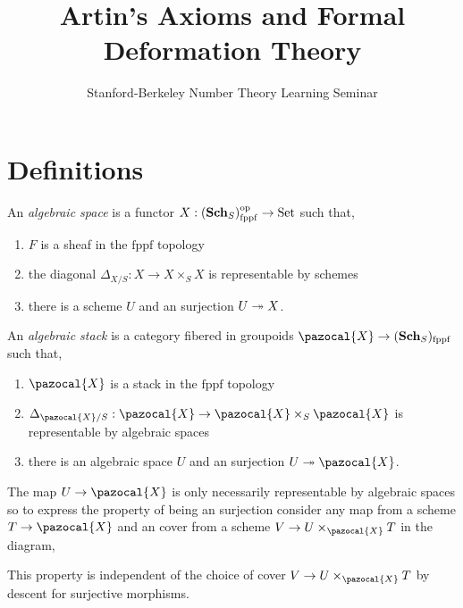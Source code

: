 \documentclass[12pt]{article}
\newcommand{\fppf}{\mathrm{fppf}}
\newcommand{\Set}{\mathrm{Set}}
\renewcommand{\X}{\pazocal{X}}
\begin{document}
\title{Artin's Axioms and Formal Deformation Theory}
\author{Stanford-Berkeley Number Theory Learning Seminar}
\maketitle

\section{Definitions}


\begin{defn}
An \textit{algebraic space} is a functor $X : (\Sch_S)_{\fppf}^{\op} \to \Set$ such that,
\begin{enumerate}
\item $F$ is a sheaf in the $\fppf$ topology
\item the diagonal $\Delta_{X/S} : X \to X \times_S X$ is representable by schemes
\item there is a scheme $U$ and an \etale surjection $U \twoheadrightarrow X$.
\end{enumerate}
\end{defn}

\begin{defn}
An \textit{algebraic stack} is a category fibered in groupoids $\X \to (\Sch_S)_{\fppf}$ such that,
\begin{enumerate}
\item $\X$ is a stack in the $\fppf$ topology
\item $\Delta_{\X / S} : \X \to \X \times_S \X$ is representable by algebraic spaces 
\item there is an algebraic space $U$ and an \etale surjection $U \onto \X$.
\end{enumerate}
\end{defn}

\begin{rmk}
The map $U \to \X$ is only necessarily representable by algebraic spaces so to express the property of being an \etale surjection consider any map from a scheme $T \to \X$ and an \etale cover from a scheme $V \to U \times_{\X} T$ in the diagram,
\begin{center}
\end{center}
This property is independent of the choice of \etale cover $V \to U \times_{\X} T$ by \etale descent for \etale surjective morphisms.
\end{rmk}
\end{document}
